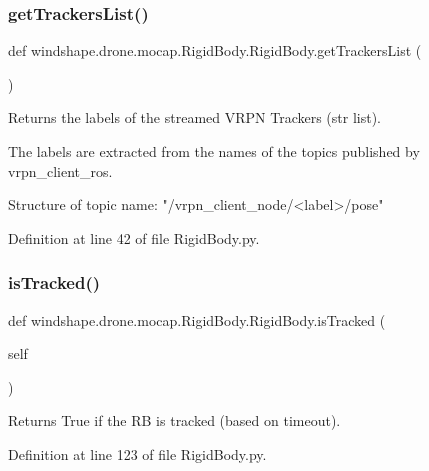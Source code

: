 \subsubsection{\texorpdfstring{get\+Trackers\+List()}{getTrackersList()}}
{\footnotesize\ttfamily def windshape.\+drone.\+mocap.\+Rigid\+Body.\+Rigid\+Body.\+get\+Trackers\+List (\begin{DoxyParamCaption}{ }\end{DoxyParamCaption})\hspace{0.3cm}{\ttfamily [static]}}

\begin{DoxyVerb}Returns the labels of the streamed VRPN Trackers (str list).

The labels are extracted from the names of the topics published
by vrpn_client_ros.

Structure of topic name: "/vrpn_client_node/<label>/pose"
\end{DoxyVerb}
 

Definition at line 42 of file Rigid\+Body.\+py.

\mbox{\label{classwindshape_1_1drone_1_1mocap_1_1_rigid_body_1_1_rigid_body_ad094c24d63255feeb6280825e7731596}} 
\subsubsection{\texorpdfstring{is\+Tracked()}{isTracked()}}
{\footnotesize\ttfamily def windshape.\+drone.\+mocap.\+Rigid\+Body.\+Rigid\+Body.\+is\+Tracked (\begin{DoxyParamCaption}\item[{}]{self }\end{DoxyParamCaption})}

\begin{DoxyVerb}Returns True if the RB is tracked (based on timeout).\end{DoxyVerb}
 

Definition at line 123 of file Rigid\+Body.\+py.

